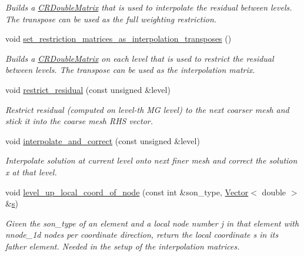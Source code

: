 \begin{DoxyCompactItemize}
\begin{DoxyCompactList}\small\item\em Builds a \hyperlink{classoomph_1_1CRDoubleMatrix}{C\+R\+Double\+Matrix} that is used to interpolate the residual between levels. The transpose can be used as the full weighting restriction. \end{DoxyCompactList}\item 
void \hyperlink{classoomph_1_1HelmholtzMGPreconditioner_a9199207c647475375acd63944e28fdf2}{set\+\_\+restriction\+\_\+matrices\+\_\+as\+\_\+interpolation\+\_\+transposes} ()
\begin{DoxyCompactList}\small\item\em Builds a \hyperlink{classoomph_1_1CRDoubleMatrix}{C\+R\+Double\+Matrix} on each level that is used to restrict the residual between levels. The transpose can be used as the interpolation matrix. \end{DoxyCompactList}\item 
void \hyperlink{classoomph_1_1HelmholtzMGPreconditioner_a013c21557363edf86790fa98a1da2aff}{restrict\+\_\+residual} (const unsigned \&level)
\begin{DoxyCompactList}\small\item\em Restrict residual (computed on level-\/th MG level) to the next coarser mesh and stick it into the coarse mesh R\+HS vector. \end{DoxyCompactList}\item 
void \hyperlink{classoomph_1_1HelmholtzMGPreconditioner_a8198021ac078989b3593acf8dbb7f572}{interpolate\+\_\+and\+\_\+correct} (const unsigned \&level)
\begin{DoxyCompactList}\small\item\em Interpolate solution at current level onto next finer mesh and correct the solution x at that level. \end{DoxyCompactList}\item 
void \hyperlink{classoomph_1_1HelmholtzMGPreconditioner_a6a82f0212ff1277a1e8c33a6a81bfeff}{level\+\_\+up\+\_\+local\+\_\+coord\+\_\+of\+\_\+node} (const int \&son\+\_\+type, \hyperlink{classoomph_1_1Vector}{Vector}$<$ double $>$ \&\hyperlink{cfortran_8h_ab7123126e4885ef647dd9c6e3807a21c}{s})
\begin{DoxyCompactList}\small\item\em Given the son\+\_\+type of an element and a local node number j in that element with nnode\+\_\+1d nodes per coordinate direction, return the local coordinate s in its father element. Needed in the setup of the interpolation matrices. \end{DoxyCompactList}\item 

\end{DoxyCompactItemize}
